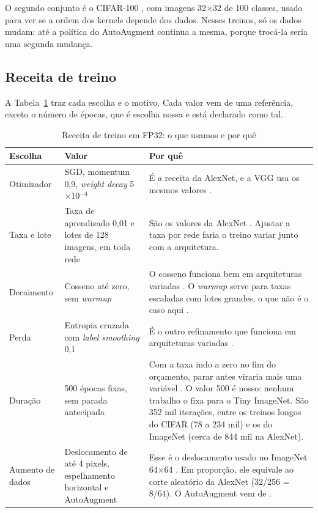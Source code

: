 \documentclass[conference]{IEEEtran}
\newcommand{\by}{\ensuremath{\times}}
\begin{document}
O segundo conjunto é o CIFAR-100 \cite{krizhevsky2009learning}, com imagens 32\by32 de 100 classes, usado para ver se a ordem dos
kernels depende dos dados. Nesses treinos, só os dados mudam: até a política do AutoAugment continua a mesma, porque trocá-la seria uma
segunda mudança.

\subsection{Receita de treino}
\label{sec:receita}

A Tabela~\ref{tab:receita} traz cada escolha e o motivo. Cada valor vem de uma referência, exceto o número de épocas, que é escolha nossa e está declarado como tal.

\begin{table}[!t]
\caption{Receita de treino em FP32: o que usamos e por quê}
\label{tab:receita}
\centering
\footnotesize
\begin{tabular}{@{}p{}p{}p{}@{}}
\toprule
\textbf{Escolha} & \textbf{Valor} & \textbf{Por quê} \\
\midrule
Otimizador & SGD, momentum 0,9, \textit{weight decay} 5$\times$10$^{-4}$ & É a receita da AlexNet, e a VGG usa os mesmos valores \cite{krizhevsky2012imagenet,simonyan2015very}. \\
Taxa e lote & Taxa de aprendizado 0,01 e lotes de 128 imagens, em toda rede & São os valores da AlexNet \cite{krizhevsky2012imagenet}. Ajustar a taxa por rede faria o treino variar junto com a arquitetura. \\
Decaimento & Cosseno até zero, sem \textit{warmup} & O cosseno funciona bem em arquiteturas variadas \cite{he2019bag}. O \textit{warmup} serve para taxas escaladas com lotes grandes, o que não é o caso aqui \cite{goyal2017accurate}. \\
Perda & Entropia cruzada com \textit{label smoothing} 0,1 & É o outro refinamento que funciona em arquiteturas variadas \cite{szegedy2016rethinking,he2019bag}. \\
Duração & 500 épocas fixas, sem parada antecipada & Com a taxa indo a zero no fim do orçamento, parar antes viraria mais uma variável \cite{li2020budgeted}. O valor 500 é nosso: nenhum trabalho o fixa para o Tiny ImageNet. São 352 mil iterações, entre os treinos longos do CIFAR (78 a 234 mil) e os do ImageNet (cerca de 844 mil na AlexNet). \\
Aumento de dados & Deslocamento de até 4 pixels, espelhamento horizontal e AutoAugment & Esse é o deslocamento usado no ImageNet 64\by64 \cite{chrabaszcz2017downsampled}. Em proporção, ele equivale ao corte aleatório da AlexNet (32/256 = 8/64). O AutoAugment vem de \cite{cubuk2019autoaugment}. \\

\end{tabular}
\end{table}
\end{document}
